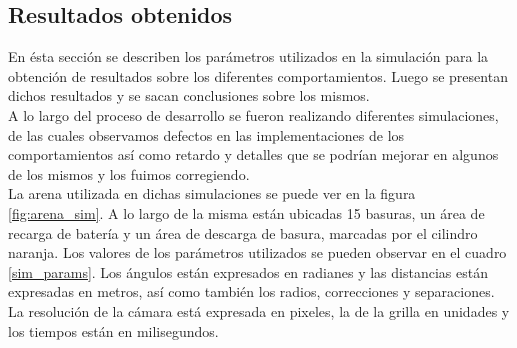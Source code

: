 \subsection{Resultados obtenidos}
\label{results}
En \'esta secci\'on se describen los par\'ametros utilizados en la
simulaci\'on para la obtenci\'on de resultados sobre los diferentes
comportamientos. Luego se presentan dichos resultados y se sacan
conclusiones sobre los mismos.
\\
A lo largo del proceso de desarrollo se fueron realizando diferentes simulaciones,
de las cuales observamos defectos en las implementaciones de los comportamientos
as\'i como retardo y detalles que se podr\'ian mejorar en algunos de los mismos
y los fuimos corregiendo. \\
La arena utilizada en dichas simulaciones se puede ver en la figura \ref{fig:arena_sim}.
A lo largo de la misma est\'an ubicadas 15 basuras, un \'area de recarga de bater\'ia
y un \'area de descarga de basura, marcadas por el cilindro naranja. Los valores de
los par\'ametros utilizados se pueden observar en el cuadro \ref{sim_params}. Los
\'angulos est\'an expresados en radianes y las distancias est\'an expresadas en metros,
as\'i como tambi\'en los radios, correcciones y separaciones. La resoluci\'on de la
c\'amara est\'a expresada en pixeles, la de la grilla en unidades y los tiempos est\'an
en milisegundos.
